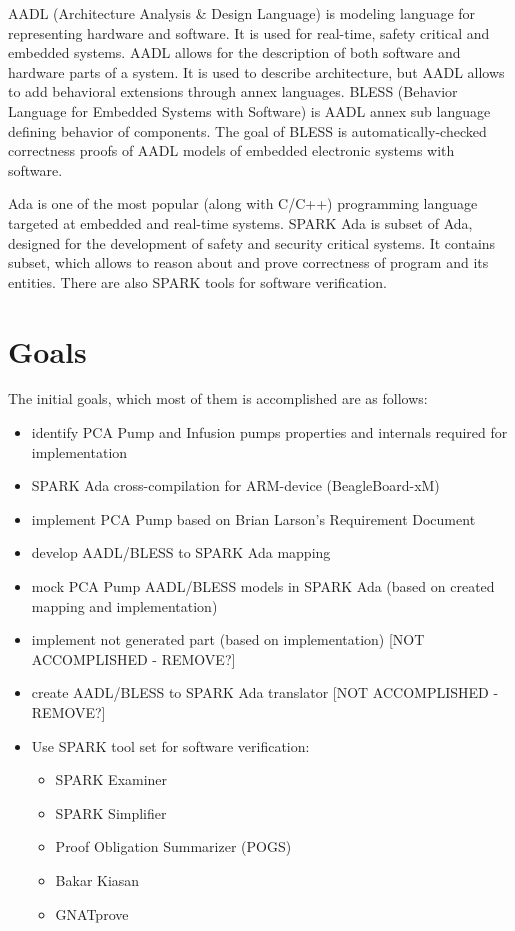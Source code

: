 AADL (Architecture Analysis \& Design Language) is modeling language for representing hardware and software. It is used for real-time, safety critical and embedded systems. AADL allows for the description of both software and hardware parts of a system. It is used to describe architecture, but AADL allows to add behavioral extensions through annex languages. BLESS (Behavior Language for Embedded Systems with Software) is AADL annex sub language defining behavior of components. The goal of BLESS is automatically-checked correctness proofs of AADL models of embedded electronic systems with software.

Ada is one of the most popular (along with C/C++) programming language targeted at embedded and real-time systems. SPARK Ada is subset of Ada, designed for the development of safety and security critical systems. It contains subset, which allows to reason about and prove correctness of program and its entities. There are also SPARK tools for software verification.

\section{Goals}
\label{introduction:goals}
The initial goals, which most of them is accomplished are as follows:
\begin{itemize}
	\item identify PCA Pump and Infusion pumps properties and internals required for implementation
	\item SPARK Ada cross-compilation for ARM-device (BeagleBoard-xM)
	\item implement PCA Pump based on Brian Larson's Requirement Document \cite{OpenSourcePCAPump:Paper}
	\item develop AADL/BLESS to SPARK Ada mapping
	\item mock PCA Pump AADL/BLESS models in SPARK Ada (based on created mapping and implementation)
	\item implement not generated part (based on implementation) [NOT ACCOMPLISHED - REMOVE?]
	\item create AADL/BLESS to SPARK Ada translator [NOT ACCOMPLISHED - REMOVE?]
	\item Use SPARK tool set for software verification:
		\begin{itemize}
			\item SPARK Examiner
			\item SPARK Simplifier
			\item Proof Obligation Summarizer (POGS)
			\item Bakar Kiasan
			\item GNATprove
		\end{itemize}
\end{itemize}


